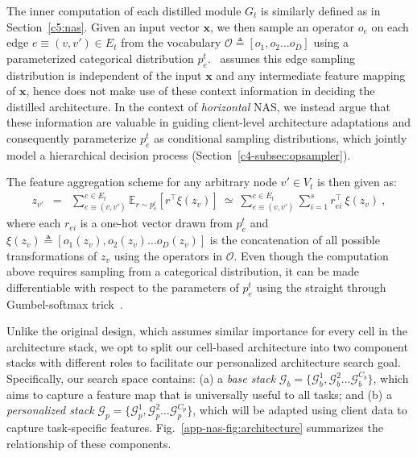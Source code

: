 The inner computation of each distilled module $G_t$ is similarly defined as in Section~\ref{c5:nas}. Given an input vector $\mathbf{x}$, we then sample an operator $o_e$ on each edge $e \equiv (v, v') \in E_t$ from the vocabulary $\mathcal{O} \triangleq \left[o_1, o_2 \dots o_D\right]$ using a parameterized categorical distribution $p^t_e$.~\citet{hu2020} assumes this edge sampling distribution is independent of the input $\mathbf{x}$ and any intermediate feature mapping of $\mathbf{x}$, hence does not make use of these context information in deciding the distilled architecture. In the context of \emph{horizontal} NAS, we instead argue that these information are valuable in guiding client-level architecture adaptations and consequently parameterize $p^t_e$ as conditional sampling distributions, which jointly model a hierarchical decision process (Section~\ref{c4-subsec:opsampler}). 

The feature aggregation scheme for any arbitrary node $v' \in V_t$ is then given as:
\begin{eqnarray}
z_{v'} &=& \sum_{e\equiv(v,v')}^{e \in E_t} \mathbb{E}_{r \sim p^t_e}\left[r^\top \xi(z_v)\right] \ \simeq \ \sum_{e\equiv(v,v')}^{e \in E_t} \sum_{i=1}^s r_{ei}^\top \ \xi(z_v) \ ,
\end{eqnarray}
where each $r_{ei}$ is a one-hot vector drawn from $p^t_e$ and $\xi(z_v) \triangleq \left[o_1(z_v), o_2(z_v) \dots o_D(z_v)\right]$ is the concatenation of all possible transformations of $z_v$ using the operators in $\mathcal{O}$. Even though the computation above requires sampling from a categorical distribution, it can be made differentiable with respect to the parameters of $p^t_{e}$ using the straight through Gumbel-softmax trick~\cite{jang2016}. %

Unlike the original design, which assumes similar importance for every cell in the architecture stack, we opt to split our cell-based architecture into two component stacks with different roles to facilitate our personalized architecture search goal. Specifically, our search space contains: (a) a \emph{base stack} $\mathcal{G}_b = \{\mathcal{G}_b^1, \mathcal{G}_b^2 \dots \mathcal{G}_b^{C_b}\}$, which aims to capture a feature map that is universally useful to all tasks; and (b) a \emph{personalized stack} $\mathcal{G}_p = \{\mathcal{G}_p^1, \mathcal{G}_p^2 \dots \mathcal{G}_p^{C_p}\}$, which will be adapted using client data to capture task-specific features. Fig.~\ref{app-nas-fig:architecture} summarizes the relationship of these components. 

